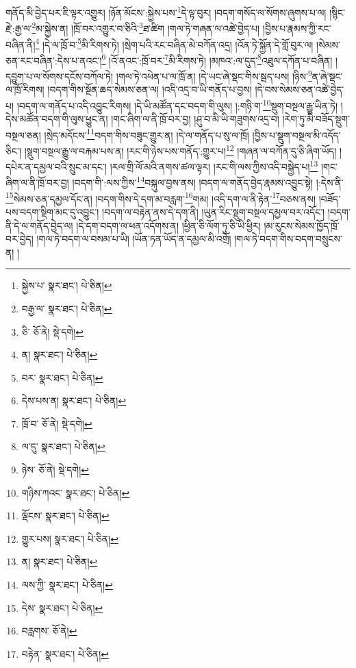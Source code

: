 གནོད་མི་བྱེད་པར་ཇི་ལྟར་འགྱུར། །ཉོན་མོངས་:སྐྱེས་པས་\footnote{སྐྱེས་པ་  སྣར་ཐང་།  པེ་ཅིན། }དེ་ལྟ་བུར། །བདག་གསོད་ལ་སོགས་ཞུགས་པ་ལ། །སྙིང་རྗེ་:རྒྱ་ལ་\footnote{བརྒྱ་ལ་  སྣར་ཐང་།  པེ་ཅིན། }མ་སྐྱེས་ན། །ཁྲོ་བར་འགྱུར་བ་ཅིའི་\footnote{ཅི་  ཅོ་ནེ།  སྡེ་དགེ། }ཐ་ཚིག །གལ་ཏེ་གཞན་ལ་འཚེ་བྱེད་པ། །བྱིས་པ་རྣམས་ཀྱི་རང་བཞིན་ནི།\footnote{ན།  སྣར་ཐང་།  པེ་ཅིན། } །དེ་ལ་ཁྲོ་བ་\footnote{བར་  སྣར་ཐང་།  པེ་ཅིན། }མི་རིགས་ཏེ། །སྲེག་པའི་རང་བཞིན་མེ་བཀོན་འདྲ། །འོན་ཏེ་སྐྱོན་དེ་གློ་བུར་ལ། །སེམས་ཅན་རང་བཞིན་:དེས་པ་ནའང་།\footnote{དེས་པས་ན།  སྣར་ཐང་།  པེ་ཅིན། } །འོ་ནའང་:ཁྲོ་བར་\footnote{ཁྲོ་བ་  ཅོ་ནེ།  སྡེ་དགེ། }མི་རིགས་ཏེ། །མཁའ་:ལ་དུད་\footnote{ལ་དུ་  སྣར་ཐང་།  པེ་ཅིན། }འཐུལ་དཀོན་པ་བཞིན། །དབྱུག་པ་ལ་སོགས་དངོས་བཀོལ་ཏེ། །གལ་ཏེ་འཕེན་པ་ལ་ཁྲོ་ན། །དེ་ཡང་ཞེ་སྡང་གིས་སྦད་པས། །ཉིས་\footnote{ཉེས་  ཅོ་ནེ།  སྡེ་དགེ། }ན་ཞེ་སྡང་ལ་ཁྲོ་རིགས། །བདག་གིས་སྔོན་ཆད་སེམས་ཅན་ལ། །འདི་འདྲ་བ་ཡི་གནོད་པ་བྱས། །དེ་བས་སེམས་ཅན་འཚེ་བྱེད་པ། །བདག་ལ་གནོད་པ་འདི་འབྱུང་རིགས། །དེ་ཡི་མཚོན་དང་བདག་གི་ལུས། །:གཉི་ག་\footnote{གཉིས་ཀའང་  སྣར་ཐང་།  པེ་ཅིན། }སྡུག་བསྔལ་རྒྱུ་ཡིན་ཏེ། །དེས་མཚོན་བདག་གི་ལུས་ཕྱུང་ན། །གང་ཞིག་ལ་ནི་ཁྲོ་བར་བྱ། །ཤུ་བ་མི་ཡི་གཟུགས་འདྲ་བ། །རེག་ཏུ་མི་བཟོད་སྡུག་བསྔལ་ཅན། །སྲེད་མདོངས་\footnote{ལྡོངས་  སྣར་ཐང་།  པེ་ཅིན། }བདག་གིས་བཟུང་གྱུར་ན། །དེ་ལ་གནོད་པ་སུ་ལ་ཁྲོ། །བྱིས་པ་སྡུག་བསྔལ་མི་འདོད་ཅིང་། །སྡུག་བསྔལ་རྒྱུ་ལ་བརྐམ་པས་ན། །རང་གི་ཉེས་པས་གནོད་:གྱུར་པ།\footnote{གྱུར་པས།  སྣར་ཐང་།  པེ་ཅིན། } །གཞན་ལ་བཀོན་དུ་ཅི་ཞིག་ཡོད། །དཔེར་ན་དམྱལ་བའི་སྲུང་མ་དང་། །རལ་གྲི་ལོ་མའི་ནགས་ཚལ་ལྟར། །རང་གི་ལས་ཀྱིས་འདི་བསྐྱེད་པ།\footnote{ན།  སྣར་ཐང་།  པེ་ཅིན། } །གང་ཞིག་ལ་ནི་ཁྲོ་བར་བྱ། །བདག་གི་:ལས་ཀྱིས་\footnote{ལས་ཀྱི་  སྣར་ཐང་།  པེ་ཅིན། }བསྐུལ་བྱས་ནས། །བདག་ལ་གནོད་བྱེད་རྣམས་འབྱུང་སྟེ། །:དེས་ནི་\footnote{དེས་  སྣར་ཐང་།  པེ་ཅིན། }སེམས་ཅན་དམྱལ་དོང་ན། །བདག་གིས་དེ་དག་མ་བརླག་\footnote{བརླགས་  ཅོ་ནེ། }གམ། །འདི་དག་ལ་ནི་རྟེན་\footnote{བརྟེན་  སྣར་ཐང་།  པེ་ཅིན། }བཅས་ནས། །བཟོད་པས་བདག་སྡིག་མང་དུ་འབྱུང་། །བདག་ལ་བརྟེན་ནས་དེ་དག་ནི། །ཡུན་རིང་སྡུག་བསྔལ་དམྱལ་བར་འདོང་། །བདག་ནི་དེ་ལ་གནོད་བྱེད་ལ། །དེ་དག་བདག་ལ་ཕན་འདོགས་ན། །ཕྱིན་ཅི་ལོག་ཏུ་ཅི་ཡི་ཕྱིར། །མ་རུངས་སེམས་ཁྱོད་ཁྲོ་བར་བྱེད། །གལ་ཏེ་བདག་ལ་བསམ་པ་ཡི། །ཡོན་ཏན་ཡོད་ན་དམྱལ་མི་འགྲོ། །གལ་ཏེ་བདག་གིས་བདག་བསྲུངས་ན། །
